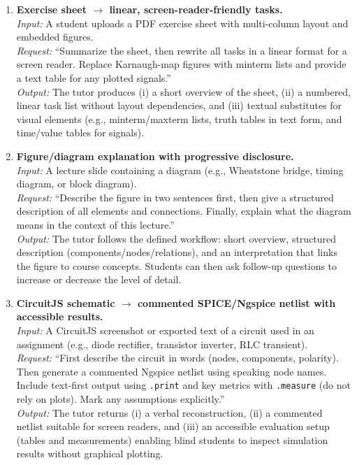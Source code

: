 \begin{enumerate}
    \item \textbf{Exercise sheet $\rightarrow$ linear, screen-reader-friendly tasks.}\\
    \emph{Input:} A student uploads a PDF exercise sheet with multi-column layout and embedded figures.\\
    \emph{Request:} ``Summarize the sheet, then rewrite all tasks in a linear format for a screen reader. Replace Karnaugh-map figures with minterm lists and provide a text table for any plotted signals.''\\
    \emph{Output:} The tutor produces (i) a short overview of the sheet, (ii) a numbered, linear task list without layout dependencies, and (iii) textual substitutes for visual elements (e.g., minterm/maxterm lists, truth tables in text form, and time/value tables for signals).

    \item \textbf{Figure/diagram explanation with progressive disclosure.}\\
    \emph{Input:} A lecture slide containing a diagram (e.g., Wheatstone bridge, timing diagram, or block diagram).\\
    \emph{Request:} ``Describe the figure in two sentences first, then give a structured description of all elements and connections. Finally, explain what the diagram means in the context of this lecture.''\\
    \emph{Output:} The tutor follows the defined workflow: short overview, structured description (components/nodes/relations), and an interpretation that links the figure to course concepts. Students can then ask follow-up questions to increase or decrease the level of detail.

    \item \textbf{CircuitJS schematic $\rightarrow$ commented SPICE/Ngspice netlist with accessible results.}\\
    \emph{Input:} A CircuitJS screenshot or exported text of a circuit used in an assignment (e.g., diode rectifier, transistor inverter, RLC transient).\\
    \emph{Request:} ``First describe the circuit in words (nodes, components, polarity). Then generate a commented Ngspice netlist using speaking node names. Include text-first output using \texttt{.print} and key metrics with \texttt{.measure} (do not rely on plots). Mark any assumptions explicitly.''\\
    \emph{Output:} The tutor returns (i) a verbal reconstruction, (ii) a commented netlist suitable for screen readers, and (iii) an accessible evaluation setup (tables and measurements) enabling blind students to inspect simulation results without graphical plotting.
\end{enumerate}

